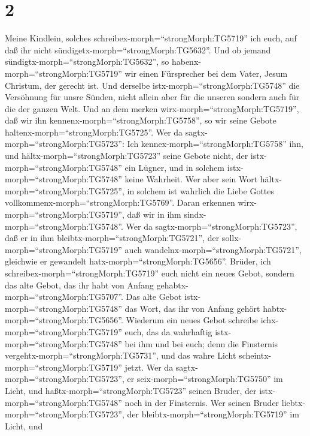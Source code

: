 \hypertarget{section-1}{%
\section{2}\label{section-1}}

 Meine Kindlein, solches
schreibex-morph=``strongMorph:TG5719'' ich euch, auf daß ihr nicht
sündigetx-morph=``strongMorph:TG5632''. Und ob jemand
sündigtx-morph=``strongMorph:TG5632'', so
habenx-morph=``strongMorph:TG5719'' wir einen Fürsprecher bei dem Vater,
Jesum Christum, der gerecht ist.  Und derselbe
istx-morph=``strongMorph:TG5748'' die Versöhnung für unsre Sünden, nicht
allein aber für die unseren sondern auch für die der ganzen Welt.
 Und an dem merken wirx-morph=``strongMorph:TG5719'', daß
wir ihn kennenx-morph=``strongMorph:TG5758'', so wir seine Gebote
haltenx-morph=``strongMorph:TG5725''.  Wer da
sagtx-morph=``strongMorph:TG5723'': Ich
kennex-morph=``strongMorph:TG5758'' ihn, und
hältx-morph=``strongMorph:TG5723'' seine Gebote nicht, der
istx-morph=``strongMorph:TG5748'' ein Lügner, und in solchem
istx-morph=``strongMorph:TG5748'' keine Wahrheit.  Wer aber
sein Wort hältx-morph=``strongMorph:TG5725'', in solchem ist wahrlich
die Liebe Gottes vollkommenx-morph=``strongMorph:TG5769''. Daran
erkennen wirx-morph=``strongMorph:TG5719'', daß wir in ihm
sindx-morph=``strongMorph:TG5748''.  Wer da
sagtx-morph=``strongMorph:TG5723'', daß er in ihm
bleibtx-morph=``strongMorph:TG5721'', der
sollx-morph=``strongMorph:TG5719'' auch
wandelnx-morph=``strongMorph:TG5721'', gleichwie er gewandelt
hatx-morph=``strongMorph:TG5656''.  Brüder, ich
schreibex-morph=``strongMorph:TG5719'' euch nicht ein neues Gebot,
sondern das alte Gebot, das ihr habt von Anfang
gehabtx-morph=``strongMorph:TG5707''. Das alte Gebot
istx-morph=``strongMorph:TG5748'' das Wort, das ihr von Anfang gehört
habtx-morph=``strongMorph:TG5656''.  Wiederum ein neues
Gebot schreibe ichx-morph=``strongMorph:TG5719'' euch, das da wahrhaftig
istx-morph=``strongMorph:TG5748'' bei ihm und bei euch; denn die
Finsternis vergehtx-morph=``strongMorph:TG5731'', und das wahre Licht
scheintx-morph=``strongMorph:TG5719'' jetzt.  Wer da
sagtx-morph=``strongMorph:TG5723'', er seix-morph=``strongMorph:TG5750''
im Licht, und haßtx-morph=``strongMorph:TG5723'' seinen Bruder, der
istx-morph=``strongMorph:TG5748'' noch in der Finsternis. 
Wer seinen Bruder liebtx-morph=``strongMorph:TG5723'', der
bleibtx-morph=``strongMorph:TG5719'' im Licht, und

